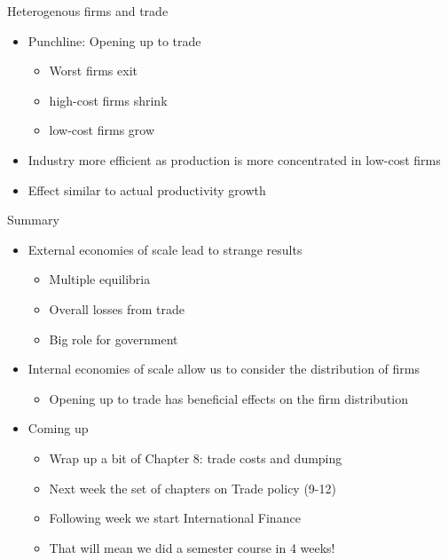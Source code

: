 \documentclass[ignorenonframetext,]{beamer}
\begin{document}
\begin{frame}{Heterogenous firms and trade}
    \begin{itemize}
        \item Punchline: Opening up to trade
        \begin{itemize}
            \item Worst firms exit
            \item high-cost firms shrink
            \item low-cost firms grow
        \end{itemize}
        \item Industry more efficient as production is more concentrated in low-cost firms
        \item Effect similar to actual productivity growth
    \end{itemize}
\end{frame}

\begin{frame}{Summary}

    \begin{itemize}
        \item External economies of scale lead to strange results
        \begin{itemize}
            \item Multiple equilibria
            \item Overall losses from trade
            \item Big role for government
        \end{itemize}
        \item Internal economies of scale allow us to consider the distribution of firms
        \begin{itemize}
            \item Opening up to trade has beneficial effects on the firm distribution 
        \end{itemize}
    \end{itemize}

\end{frame}

\begin{frame}

    \begin{itemize}
        \item Coming up
        \begin{itemize}
            \item Wrap up a bit of Chapter 8: trade costs and dumping
            \item Next week the set of chapters on Trade policy (9-12)
            \item Following week we start International Finance
            \item That will mean we did a semester course in 4 weeks!
        \end{itemize}
    \end{itemize}

\end{frame}
\end{document}
